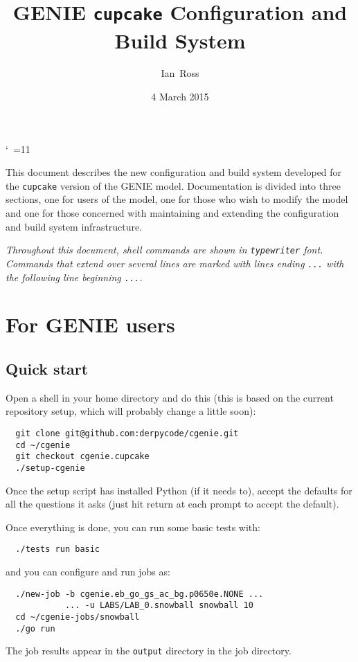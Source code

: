 \documentclass[a4paper,10pt,article]{memoir}
\title{GENIE \texttt{cupcake} Configuration and Build System}
\author{Ian~Ross}
\date{4 March 2015}
\begin{document}
\catcode`~=11    %

\maketitle

This document describes the new configuration and build system
developed for the \texttt{cupcake} version of the GENIE model.
Documentation is divided into three sections, one for users of the
model, one for those who wish to modify the model and one for those
concerned with maintaining and extending the configuration and build
system infrastructure.

\emph{Throughout this document, shell commands are shown in
  \texttt{typewriter} font.  Commands that extend over several lines
  are marked with lines ending \texttt{...} with the following line
  beginning \texttt{...}.}

\chapter{For GENIE users}

\section{Quick start}

Open a shell in your home directory and do this (this is based on the
current repository setup, which will probably change a little soon):
\begin{verbatim}
  git clone git@github.com:derpycode/cgenie.git
  cd ~/cgenie
  git checkout cgenie.cupcake
  ./setup-cgenie
\end{verbatim}
Once the setup script has installed Python (if it needs to), accept
the defaults for all the questions it asks (just hit return at each
prompt to accept the default).

Once everything is done, you can run some basic tests with:
\begin{verbatim}
  ./tests run basic
\end{verbatim}
and you can configure and run jobs as:
\begin{verbatim}
  ./new-job -b cgenie.eb_go_gs_ac_bg.p0650e.NONE ...
            ... -u LABS/LAB_0.snowball snowball 10
  cd ~/cgenie-jobs/snowball
  ./go run
\end{verbatim}
The job results appear in the \texttt{output} directory in the job
directory.
\end{document}
